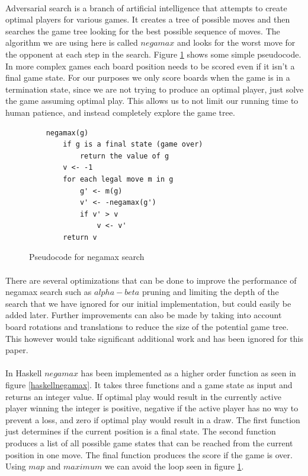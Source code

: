 \documentclass[10pt]{article}
\begin{document}
\paragraph{} Adversarial search is a branch of artificial intelligence that attempts to 
    create optimal players for various games.  It creates a tree of possible moves and 
    then searches the game tree looking for the best possible sequence of moves.  The 
    algorithm we are using here is called $negamax$ and looks for the worst move for 
    the opponent at each step in the search.  Figure \ref{negamaxpseudo} shows some
    simple pseudocode.  In more complex games each board position needs to be scored
    even if it isn't a final game state.  For our purposes we only score boards when 
    the game is in a termination state, since we are not trying to produce an optimal
    player, just solve the game assuming optimal play.  This allows us to not limit 
    our running time to human patience, and instead completely explore the game tree.

\begin{figure}[ht]
    \centering
    \begin{verbatim}
    negamax(g)
        if g is a final state (game over)
            return the value of g
        v <- -1
        for each legal move m in g
            g' <- m(g)
            v' <- -negamax(g')
            if v' > v
                v <- v'
        return v \end{verbatim}
    \caption{Pseudocode for negamax search} \label{negamaxpseudo}
\end{figure}

\paragraph{} There are several optimizations that can be done to improve the performance 
    of negamax search such as $alpha-beta$ pruning and limiting the depth of the search that we have 
    ignored for our initial implementation, but could easily be added later.  Further 
    improvements can also be made by taking into account board rotations and translations 
    to reduce the size of the potential game tree.  This however would take significant 
    additional work and has been ignored for this paper.
    
\paragraph{} In Haskell $negamax$ has been implemented as a higher order function as seen 
    in figure \ref{haskellnegamax}.  It takes three functions and a game state as input 
    and returns an integer value.  If optimal play would result in the currently active 
    player winning the integer is positive, negative if the active player has no way to 
    prevent a loss, and zero if optimal play would result in a draw.  The first function 
    just determines if the current position is a final state.  The second function 
    produces a list of all possible game states that can be reached from the current 
    position in one move.  The final function produces the score if the game is over.
    Using $map$ and $maximum$ we can avoid the loop seen in figure \ref{negamaxpseudo}.
\end{document}
